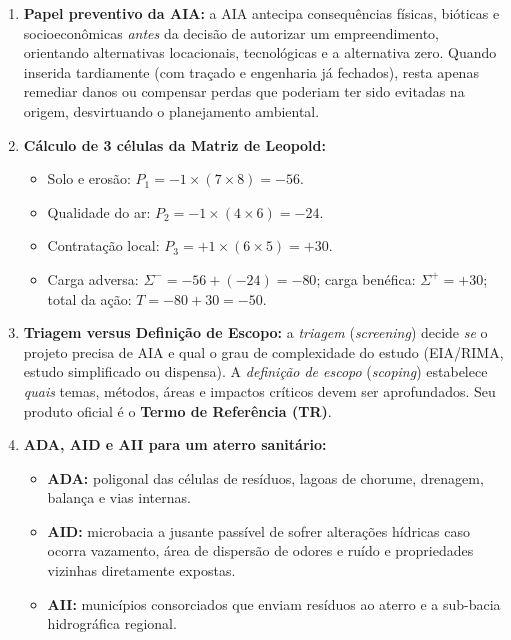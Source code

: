 \begin{boxGabarito}
  \begin{enumerate}[leftmargin=1.8em, itemsep=4pt]
    \item \textbf{Papel preventivo da AIA:} a AIA antecipa consequências físicas, bióticas e socioeconômicas \emph{antes} da decisão de autorizar um empreendimento, orientando alternativas locacionais, tecnológicas e a alternativa zero. Quando inserida tardiamente (com traçado e engenharia já fechados), resta apenas remediar danos ou compensar perdas que poderiam ter sido evitadas na origem, desvirtuando o planejamento ambiental.

    \item \textbf{Cálculo de 3 células da Matriz de Leopold:}
    \begin{itemize}[leftmargin=1.4em, itemsep=1pt]
      \item Solo e erosão: $P_1 = -1 \times (7 \times 8) = -56$.
      \item Qualidade do ar: $P_2 = -1 \times (4 \times 6) = -24$.
      \item Contratação local: $P_3 = +1 \times (6 \times 5) = +30$.
      \item Carga adversa: $\Sigma^{-} = -56 + (-24) = -80$; carga benéfica: $\Sigma^{+} = +30$; total da ação: $T = -80 + 30 = -50$.
    \end{itemize}

    \item \textbf{Triagem versus Definição de Escopo:} a \emph{triagem} (\textit{screening}) decide \emph{se} o projeto precisa de AIA e qual o grau de complexidade do estudo (EIA/RIMA, estudo simplificado ou dispensa). A \emph{definição de escopo} (\textit{scoping}) estabelece \emph{quais} temas, métodos, áreas e impactos críticos devem ser aprofundados. Seu produto oficial é o \textbf{Termo de Referência (TR)}.

    \item \textbf{ADA, AID e AII para um aterro sanitário:}
    \begin{itemize}[leftmargin=1.4em, itemsep=1pt]
      \item \textbf{ADA:} poligonal das células de resíduos, lagoas de chorume, drenagem, balança e vias internas.
      \item \textbf{AID:} microbacia a jusante passível de sofrer alterações hídricas caso ocorra vazamento, área de dispersão de odores e ruído e propriedades vizinhas diretamente expostas.
      \item \textbf{AII:} municípios consorciados que enviam resíduos ao aterro e a sub-bacia hidrográfica regional.
    \end{itemize}


\end{enumerate}
\end{boxGabarito}
